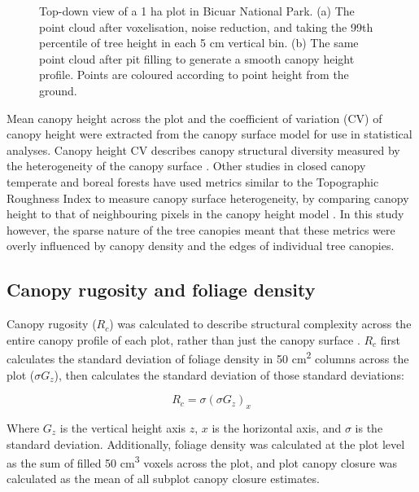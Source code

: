 \begin{refsection}
\begin{figure}
\begin{subfigure}{0.45\linewidth}
		\caption{}
		\label{workflow:P1_pit}
	\end{subfigure}
	\caption[Canopy surface model before and after pit-filling]{Top-down view of a 1 ha plot in Bicuar National Park. (a) The point cloud after voxelisation, noise reduction, and taking the 99th percentile of tree height in each 5 cm vertical bin. (b) The same point cloud after pit filling to generate a smooth canopy height profile. Points are coloured according to point height from the ground.}
	\label{workflow:P1_both}
\end{figure}

Mean canopy height across the plot and the coefficient of variation (CV) of canopy height were extracted from the canopy surface model for use in statistical analyses. Canopy height CV describes canopy structural diversity measured by the heterogeneity of the canopy surface \citep{Parker2004}. Other studies in closed canopy temperate and boreal forests have used metrics similar to the Topographic Roughness Index to measure canopy surface heterogeneity, by comparing canopy height to that of neighbouring pixels in the canopy height model \citep{Weligepolage2012, HerreroHuerta2020}. In this study however, the sparse nature of the tree canopies meant that these metrics were overly influenced by canopy density and the edges of individual tree canopies. 

\subsection{Canopy rugosity and foliage density}
\label{workflow:ssec:rugosity}

Canopy rugosity ($R_{c}$) was calculated to describe structural complexity across the entire canopy profile of each plot, rather than just the canopy surface \citep{Hardiman2011}. $R_{c}$ first calculates the standard deviation of foliage density in 50 cm\textsuperscript{2} columns across the plot ($\sigma{}G_{z}$), then calculates the standard deviation of those standard deviations: 

\begin{equation}
	R_{c} = \sigma{}(\sigma{}G_{z})_{x}
\end{equation}

Where $G_{z}$ is the vertical height axis $z$, $x$ is the horizontal axis, and $\sigma{}$ is the standard deviation. Additionally, foliage density was calculated at the plot level as the sum of filled 50 cm\textsuperscript{3} voxels across the plot, and plot canopy closure was calculated as the mean of all subplot canopy closure estimates. 


\end{refsection}
